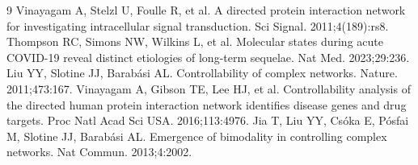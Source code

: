 \documentclass[11pt,a4paper]{article}
\begin{document}
\begin{thebibliography}{9}
 Vinayagam A, Stelzl U, Foulle R, et al. A directed protein interaction network for investigating intracellular signal transduction. Sci Signal. 2011;4(189):rs8.
 Thompson RC, Simons NW, Wilkins L, et al. Molecular states during acute COVID-19 reveal distinct etiologies of long-term sequelae. Nat Med. 2023;29:236.
 Liu YY, Slotine JJ, Barab\'asi AL. Controllability of complex networks. Nature. 2011;473:167.
 Vinayagam A, Gibson TE, Lee HJ, et al. Controllability analysis of the directed human protein interaction network identifies disease genes and drug targets. Proc Natl Acad Sci USA. 2016;113:4976.
 Jia T, Liu YY, Cs\'oka E, P\'osfai M, Slotine JJ, Barab\'asi AL. Emergence of bimodality in controlling complex networks. Nat Commun. 2013;4:2002.
\end{thebibliography}
\end{document}
